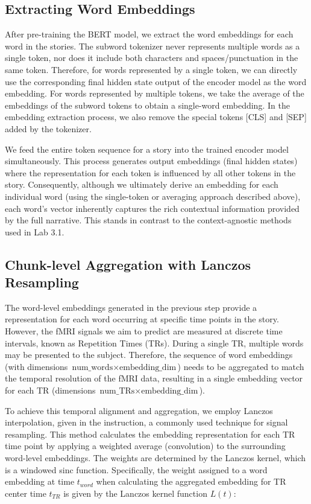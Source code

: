 \documentclass[10pt,letterpaper]{article}
\begin{document}
\subsection{Extracting Word Embeddings}
After pre-training the BERT model, we extract the word embeddings for each word in the stories. The subword tokenizer never represents multiple words as a single token, nor does it include both characters and spaces/punctuation in the same token. Therefore, for words represented by a single token, we can directly use the corresponding final hidden state output of the encoder model as the word embedding. For words represented by multiple tokens, we take the average of the embeddings of the subword tokens to obtain a single-word embedding. In the embedding extraction process, we also remove the special tokens [CLS] and [SEP] added by the tokenizer.

We feed the entire token sequence for a story into the trained encoder model simultaneously. This process generates output embeddings (final hidden states) where the representation for each token is influenced by all other tokens in the story. Consequently, although we ultimately derive an embedding for each individual word (using the single-token or averaging approach described above), each word's vector inherently captures the rich contextual information provided by the full narrative. This stands in contrast to the context-agnostic methods used in Lab 3.1.


\subsection{Chunk-level Aggregation with Lanczos Resampling}

The word-level embeddings generated in the previous step provide a representation for each word occurring at specific time points in the story. However, the fMRI signals we aim to predict are measured at discrete time intervals, known as Repetition Times (TRs). During a single TR, multiple words may be presented to the subject. Therefore, the sequence of word embeddings (with dimensions \(\text{num\_words} \times \text{embedding\_dim}\)) needs to be aggregated to match the temporal resolution of the fMRI data, resulting in a single embedding vector for each TR (dimensions \(\text{num\_TRs} \times \text{embedding\_dim}\)).

To achieve this temporal alignment and aggregation, we employ Lanczos interpolation, given in the instruction, a commonly used technique for signal resampling. This method calculates the embedding representation for each TR time point by applying a weighted average (convolution) to the surrounding word-level embeddings. The weights are determined by the Lanczos kernel, which is a windowed sinc function. Specifically, the weight assigned to a word embedding at time \(t_{word}\) when calculating the aggregated embedding for TR center time 
\(t_{TR}\) is given by the Lanczos kernel function \(L(t)\):
\end{document}
